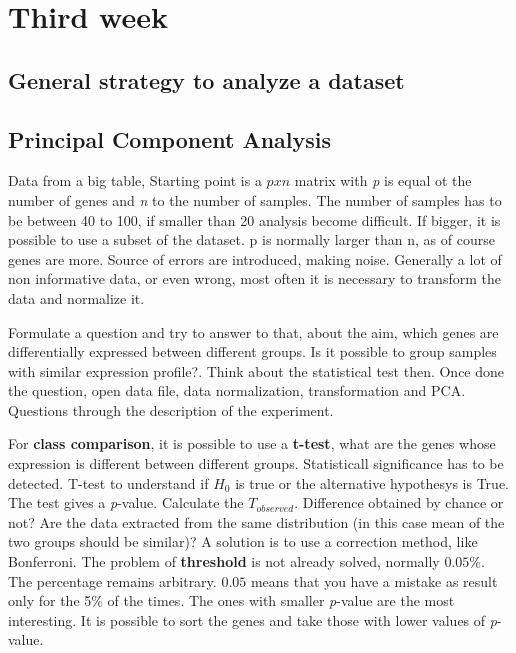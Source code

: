 \graphicspath{{chapters/images/03/}}

\chapter{Third week}

\section{General strategy to analyze a dataset}

\section{Principal Component Analysis}
Data from a big table, Starting point is a $ p x n $ matrix with \textit{p} is equal ot the number of genes and \textit{n} to the number of samples. The number of samples has to be between 40 to 100, if smaller than 20 analysis become difficult. If bigger, it is possible to use a subset of the dataset. p is normally larger than n, as of course genes are more. Source of errors are introduced, making noise. Generally a lot of non informative data, or even wrong, most often it is necessary to transform the data and normalize it. 

Formulate a question and try to answer to that, about the aim, which genes are differentially expressed between different groups. Is it possible to group samples with similar expression profile?. Think about the statistical test then. Once done the question, open data file, data normalization, transformation and PCA. Questions through the description of the experiment. 

For \textbf{class comparison}, it is possible to use a \textbf{t-test}, what are the genes whose expression is different between different groups. Statisticall significance has to be detected. T-test to understand if $H_0$ is true or the alternative hypothesys is True. The test gives a \textit{p}-value.
Calculate the $T_{observed}$. Difference obtained by chance or not? Are the data extracted from the same distribution (in this case mean of the two groups should be similar)? 
A solution is to use a correction method, like Bonferroni. The problem of \textbf{threshold} is not already solved, normally $0.05\%$. The percentage remains arbitrary. $0.05$ means that you have a mistake as result only for the 5\% of the times. 
The ones with smaller \textit{p}-value are the most interesting. It is possible to sort the genes and take those with lower values of \textit{p}-value.

